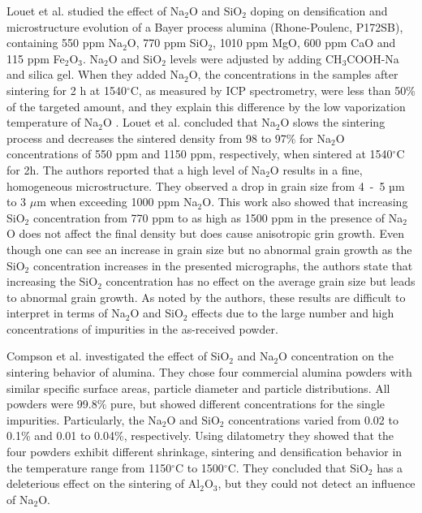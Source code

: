 Louet et al. \cite{Louet2005a} studied the effect of Na$_{2}$O and SiO$_{2}$ doping on densification and microstructure evolution of a Bayer process alumina (Rhone-Poulenc, P172SB), containing 550 ppm Na$_{2}$O, 770 ppm SiO$_{2}$, 1010 ppm MgO, 600 ppm CaO and 115 ppm Fe$_{2}$O$_{3}$. Na$_{2}$O and SiO$_{2}$ levels were adjusted by adding CH$_{3}$COOH-Na and silica gel. When they added Na$_{2}$O, the concentrations in the samples after sintering for 2 h at 1540$^{\circ}$C, as measured by ICP spectrometry, were less than 50\% of the targeted amount, and they explain this difference by the low vaporization temperature of Na$_{2}$O \cite{Louet2005a}. Louet et al. concluded that Na$_{2}$O slows the sintering process and decreases the sintered density from 98 to 97\% for Na$_{2}$O concentrations of 550 ppm and 1150 ppm, respectively, when sintered at 1540$^{\circ}$C for 2h. The authors reported that a high level of Na$_{2}$O results in a fine, homogeneous microstructure. They observed a drop in grain size from 4 - 5 µm to 3 $\mu$m when exceeding 1000 ppm Na$_{2}$O. This work also showed that increasing SiO$_{2}$ concentration from 770 ppm to as high as 1500 ppm in the presence of Na$_{2}$O does not affect the final density but does cause anisotropic grin growth. Even though one can see an increase in grain size but no abnormal grain growth as the SiO$_{2}$ concentration increases in the presented micrographs, the authors state that increasing the SiO$_{2}$ concentration has no effect on the average grain size but leads to abnormal grain growth. As noted by the authors, these results are difficult to interpret in terms of Na$_{2}$O and SiO$_{2}$ effects due to the large number and high concentrations of impurities in the as-received powder. 

Compson et al. \cite{Compson2013} investigated the effect of SiO$_{2}$ and Na$_{2}$O concentration on the sintering behavior of alumina. They chose four commercial alumina powders with similar specific surface areas, particle diameter and particle distributions. All powders were 99.8\% pure, but showed different concentrations for the single impurities. Particularly, the Na$_{2}$O and SiO$_{2}$ concentrations varied from 0.02 to 0.1\% and 0.01 to 0.04\%, respectively. Using dilatometry they showed that the four powders exhibit different shrinkage, sintering and densification behavior in the temperature range from 1150$^{\circ}$C to 1500$^{\circ}$C. They concluded that SiO$_{2}$ has a deleterious effect on the sintering of Al$_{2}$O$_{3}$, but they could not detect an influence of Na$_{2}$O.

